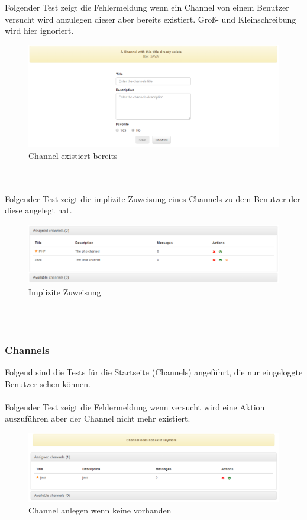 \documentclass[11pt, a4paper, twoside]{article}   	%
\begin{document}
Folgender Test zeigt die Fehlermeldung wenn ein Channel von einem Benutzer versucht wird anzulegen dieser aber bereits existiert. Groß- und Kleinschreibung wird hier ignoriert.
\begin{figure}[h]
	\centering
	\includegraphics[scale=0.5]{images/start_new_channel_fail.PNG}
	\caption
	{Channel existiert bereits}
\end{figure}\\\\

Folgender Test zeigt die implizite Zuweisung eines Channels zu dem Benutzer der diese angelegt hat.
\begin{figure}[h]
	\centering
	\includegraphics[scale=0.5]{images/start_channels_assigned_after_creation.PNG}
	\caption
	{Implizite Zuweisung}
\end{figure}\\\\
\newpage

\subsubsection{Channels}
Folgend sind die Tests für die Startseite (Channels) angeführt, die nur eingeloggte Benutzer sehen können.\\\\
Folgender Test zeigt die Fehlermeldung wenn versucht wird eine Aktion auszuführen aber der Channel nicht mehr existiert.\\
\begin{figure}[h]
	\centering
	\includegraphics[scale=0.5]{images/start_channels_action_fail.PNG}
	\caption
	{Channel anlegen wenn keine vorhanden}
\end{figure}\\\\
\end{document}
